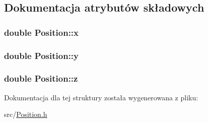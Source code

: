 \subsection{Dokumentacja atrybutów składowych}
\hypertarget{struct_position_a9abbe738bad177de91fe4774099c1260}{
\subsubsection[{x}]{\setlength{\rightskip}{0pt plus 5cm}double Position\-::x}}\label{struct_position_a9abbe738bad177de91fe4774099c1260}
\hypertarget{struct_position_a75f48c2a1d2c7131b8be1a0687ae72c8}{
\subsubsection[{y}]{\setlength{\rightskip}{0pt plus 5cm}double Position\-::y}}\label{struct_position_a75f48c2a1d2c7131b8be1a0687ae72c8}
\hypertarget{struct_position_ab26043bc2f8f6094818c17dd44e43228}{
\subsubsection[{z}]{\setlength{\rightskip}{0pt plus 5cm}double Position\-::z}}\label{struct_position_ab26043bc2f8f6094818c17dd44e43228}


Dokumentacja dla tej struktury została wygenerowana z pliku\-:\begin{DoxyCompactItemize}
\item 
src/\hyperlink{_position_8h}{Position.\-h}\end{DoxyCompactItemize}
